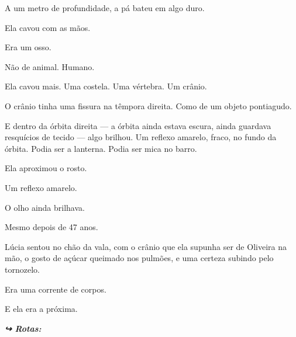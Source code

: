 \noindent A um metro de profundidade, a pá bateu em algo duro.

\noindent Ela cavou com as mãos.

\noindent Era um osso.

\noindent Não de animal. Humano.

\noindent Ela cavou mais. Uma costela. Uma vértebra. Um crânio.

\noindent O crânio tinha uma fissura na têmpora direita. Como de um objeto pontiagudo.

\noindent E dentro da órbita direita --- a órbita ainda estava escura, ainda guardava resquícios de tecido --- algo brilhou.
\noindent Um reflexo amarelo, fraco, no fundo da órbita.
\noindent Podia ser a lanterna. Podia ser mica no barro.

\noindent Ela aproximou o rosto.

\noindent Um reflexo amarelo.

\noindent O olho ainda brilhava.

\noindent Mesmo depois de 47 anos.

\noindent Lúcia sentou no chão da vala, com o crânio que ela supunha ser de Oliveira na mão, o gosto de açúcar queimado nos pulmões, e uma certeza subindo pelo tornozelo.

\noindent Era uma corrente de corpos.

\noindent E ela era a próxima.

\vspace{0.5em}
\noindent\textit{\textbf{↪ Rotas:}  \rotasep {}}